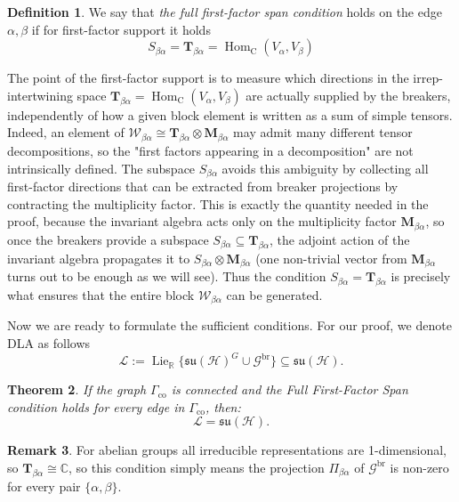 \documentclass[10pt,twocolumn,superscriptaddress,aps,amsmath,amssymb,citeautoscript,floatfix,prx]{revtex4-2}
\newcounter{alg}
\theoremstyle{plain}
\theoremstyle{plain}
\theoremstyle{plain}
\theoremstyle{plain}
\theoremstyle{plain}
\theoremstyle{plain}
\newcommand{\C}{\mathbb{C}}
\newcommand{\R}{\mathbb{R}}
\newcommand{\HH}{\mathcal{H}}
\theoremstyle{plain}
\newtheorem{smtheorem}{Theorem}[section]
\theoremstyle{definition}
\newtheorem{smdefinition}[smtheorem]{Definition}
\newtheorem{smremark}[smtheorem]{Remark}
\theoremstyle{plain}
\begin{document}
\begin{appendix}
\begin{smdefinition}\label{def:first_factor}
    We say that \textit{the full first-factor span condition} holds on the edge ${\alpha, \beta}$ if for first-factor support it holds
    \[
        S_{\beta \alpha}=\mathbf{T}_{\beta \alpha}=\operatorname{Hom}_{\mathrm{C}}\left(V_\alpha, V_\beta\right)
    \]
\end{smdefinition}

The point of the first-factor support is to measure which directions in the irrep-intertwining space $\mathbf{T}_{\beta\alpha}=\operatorname{Hom}_{\mathrm{C}}\left(V_\alpha, V_\beta\right)$ are actually supplied by the breakers, 
independently of how a given block element is written as a sum of simple tensors. Indeed, an element of $\mathcal{W}_{\beta \alpha} \cong \mathbf{T}_{\beta \alpha} \otimes \mathbf{M}_{\beta \alpha}$ 
may admit many different tensor decompositions, so the "first factors appearing in a decomposition" are not intrinsically defined. The subspace $S_{\beta \alpha}$ avoids this ambiguity by collecting 
all first-factor directions that can be extracted from breaker projections by contracting the multiplicity factor. 
This is exactly the quantity needed in the proof, because the invariant algebra acts only on the multiplicity factor $\mathbf{M}_{\beta \alpha}$, so once the breakers provide a subspace $S_{\beta \alpha} \subseteq\mathbf{T}_{\beta \alpha}$, 
the adjoint action of the invariant algebra propagates it to $S_{\beta \alpha} \otimes \mathbf{M}_{\beta \alpha}$ (one non-trivial vector from $\mathbf{M}_{\beta \alpha}$ turns out to be enough as we will see). Thus the condition $S_{\beta \alpha}=\mathbf{T}_{\beta \alpha}$ 
is precisely what ensures that the entire block $\mathcal{W}_{\beta \alpha}$ can be generated.

Now we are ready to formulate the sufficient conditions. For our proof, we denote DLA as follows
\begin{equation}\label{eq:DLA_with_breakers}
    \mathcal{L}:=\operatorname{Lie}_{\R}\{\mathfrak{su}(\HH)^G \cup \mathcal{G}^{\text{br}}\} \subseteq \mathfrak{su}(\HH).
\end{equation}
\begin{smtheorem} \label{thm:main_real}
    If the graph $\Gamma_{\mathrm{co}}$ is connected and the Full First-Factor Span condition holds for every edge in $\Gamma_{\mathrm{co}}$, then:
    \begin{equation*}
        \mathcal{L} = \mathfrak{su}(\HH).
    \end{equation*}
\end{smtheorem}
\begin{smremark}
    For abelian groups all irreducible representations are 1-dimensional, so $\mathbf{T}_{\beta\alpha} \cong \C$, so this condition simply means the projection $\Pi_{\beta \alpha}$ of $\mathcal{G}^{\text{br}}$ is non-zero
    for every pair $\{\alpha, \beta\}$.
\end{smremark}


\end{appendix}
\end{document}
